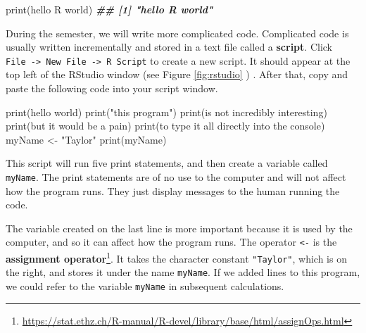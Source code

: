 \documentclass[
  12pt,
  krantz2]{krantz}
\makeatletter
\newenvironment{Shaded}{\begin{snugshade}}{\end{snugshade}}
\newcommand{\DocumentationTok}[1]{\textcolor[rgb]{0.37,0.37,0.37}{\textbf{\textit{#1}}}}
\newcommand{\FunctionTok}[1]{\textcolor[rgb]{0,0,0}{#1}}
\newcommand{\NormalTok}[1]{#1}
\newcommand{\OtherTok}[1]{\textcolor[rgb]{0.37,0.37,0.37}{#1}}
\newcommand{\StringTok}[1]{\textcolor[rgb]{0.5,0.5,0.5}{#1}}
\renewcommand{\href}[2]{#2\footnote{\url{#1}}}
\newenvironment{kframe}{%
\medskip{}
\setlength{\fboxsep}{.8em}
 \def\at@end@of@kframe{}%
 \ifinner\ifhmode%
  \def\at@end@of@kframe{\end{minipage}}%
  \begin{minipage}{\columnwidth}%
 \fi\fi%
 \def\FrameCommand##1{\hskip\@totalleftmargin \hskip-\fboxsep
 \colorbox{shadecolor}{##1}\hskip-\fboxsep
     \hskip-\linewidth \hskip-\@totalleftmargin \hskip\columnwidth}%
 \MakeFramed {\advance\hsize-\width
   \@totalleftmargin\z@ \linewidth\hsize
   \@setminipage}}%
 {\par\unskip\endMakeFramed%
 \at@end@of@kframe}
\renewenvironment{Shaded}{\begin{kframe}}{\end{kframe}}
\makeatother
\begin{document}
\begin{Shaded}
\begin{Highlighting}[]
\FunctionTok{print}\NormalTok{(}\StringTok{\textquotesingle{}hello R world\textquotesingle{}}\NormalTok{)}
\DocumentationTok{\#\# [1] "hello R world"}
\end{Highlighting}
\end{Shaded}

During the semester, we will write more complicated code. Complicated code is usually written incrementally and stored in a text file called a \textbf{script}. Click \texttt{File\ -\textgreater{}\ New\ File\ -\textgreater{}\ R\ Script} to create a new script. It should appear at the top left of the RStudio window (see Figure \ref{fig:rstudio} ) . After that, copy and paste the following code into your script window.

\begin{Shaded}
\begin{Highlighting}[]
\FunctionTok{print}\NormalTok{(}\StringTok{\textquotesingle{}hello world\textquotesingle{}}\NormalTok{)}
\FunctionTok{print}\NormalTok{(}\StringTok{"this program"}\NormalTok{)}
\FunctionTok{print}\NormalTok{(}\StringTok{\textquotesingle{}is not incredibly interesting\textquotesingle{}}\NormalTok{)}
\FunctionTok{print}\NormalTok{(}\StringTok{\textquotesingle{}but it would be a pain\textquotesingle{}}\NormalTok{)}
\FunctionTok{print}\NormalTok{(}\StringTok{\textquotesingle{}to type it all directly into the console\textquotesingle{}}\NormalTok{)}
\NormalTok{myName }\OtherTok{\textless{}{-}} \StringTok{"Taylor"}
\FunctionTok{print}\NormalTok{(myName)}
\end{Highlighting}
\end{Shaded}

This script will run five print statements, and then create a variable called \texttt{myName}. The print statements are of no use to the computer and will not affect how the program runs. They just display messages to the human running the code.

The variable created on the last line is more important because it is used by the computer, and so it can affect how the program runs. The operator \texttt{\textless{}-} is the \href{https://stat.ethz.ch/R-manual/R-devel/library/base/html/assignOps.html}{\textbf{assignment operator}}. It takes the character constant \texttt{"Taylor"}, which is on the right, and stores it under the name \texttt{myName}. If we added lines to this program, we could refer to the variable \texttt{myName} in subsequent calculations.
\end{document}
